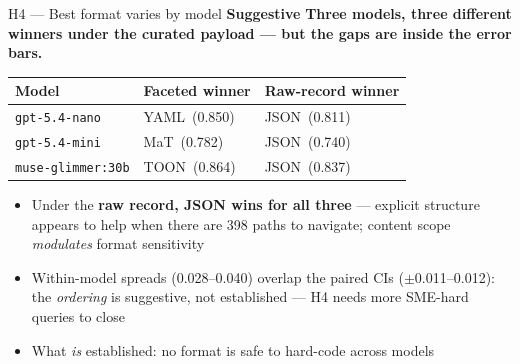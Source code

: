 \documentclass[aspectratio=169,10pt]{beamer}
\newcommand{\verdictwarn}[1]{\textcolor{warn}{\textbf{#1}}}
\begin{document}
\begin{frame}{H4 --- Best format varies by model \hfill \verdictwarn{Suggestive}}
  \textbf{Three models, three different winners under the curated payload --- but the gaps are
  inside the error bars.}
  \bigskip
  \begin{center}
  \renewcommand{\arraystretch}{1.4}
  \begin{tabular}{@{}lll@{}}
    \toprule
    Model & Faceted winner & Raw-record winner \\
    \midrule
    \texttt{gpt-5.4-nano} & YAML \,(0.850) & JSON \,(0.811) \\
    \texttt{gpt-5.4-mini} & MaT \,(0.782) & JSON \,(0.740) \\
    \texttt{muse-glimmer:30b} & TOON \,(0.864) & JSON \,(0.837) \\
    \bottomrule
  \end{tabular}
  \end{center}
  \bigskip
  \begin{itemize}
    \item Under the \textbf{raw record, JSON wins for all three} --- explicit structure appears to
      help when there are 398 paths to navigate; content scope \textit{modulates} format sensitivity
    \item Within-model spreads (0.028--0.040) overlap the paired CIs ($\pm$0.011--0.012):
      the \textit{ordering} is suggestive, not established --- H4 needs more SME-hard queries to close
    \item What \textit{is} established: no format is safe to hard-code across models
  \end{itemize}
\end{frame}
\end{document}
